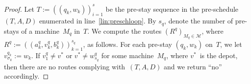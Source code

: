 \documentclass[natbib,sort,smallextended,envcountsame,envcountsect,numbook]{svjour3}
\newcommand{\Ms}{\mathcal M}
\begin{document}
\begin{proof}
  Let \(T:=(({q_k},w_k))_{i=1}^s\) be the pre-stay sequence
  in the pre-schedule~\((T,A,D)\) enumerated in line~\ref{lin:preschloop}.
  By \(s_q\), denote the number of pre-stays of a machine~\(M_q\) in~\(T\).
  We compute the routes \((R^q)_{M_q\in\Ms}\),
  where \(R^q:=((a_k^q,v_k^q,b_k^q))_{k=1}^{s_q}\), as follows.
For each pre-stay \(({q_k},w_k)\) on~\(T\),
we let~\(v_{\sigma_k}^{q_k}:=w_k\).  If \(v_1^q\ne v^*\) or \(v^*\ne w_{s_q}^q\)
for some machine~\(M_q\), where \(v^*\)~is the depot, then there are no routes
complying with~\((T,A,D)\) and  we return ``no'' accordingly.


\end{proof}
\end{document}
